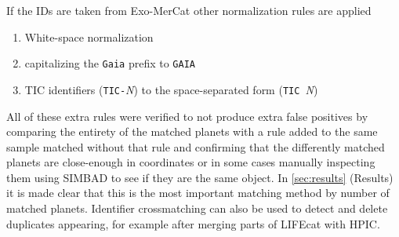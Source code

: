 If the IDs are taken from Exo-MerCat other normalization rules are applied 
\begin{enumerate}
    \item White-space normalization
    \item capitalizing the \texttt{Gaia} prefix to \texttt{GAIA}
    \item TIC identifiers (\texttt{TIC-}\textit{N}) to the space-separated form (\texttt{TIC~}\textit{N}) 
\end{enumerate} 
 All of these extra rules were verified to not produce extra false positives by comparing the entirety of the matched planets with a rule added to the same sample matched without that rule and confirming that the differently matched planets are close-enough in coordinates or in some cases manually inspecting them using SIMBAD to see if they are the same object.
In \cref{sec:results} (Results) it is made clear that this is the most important matching method by number of matched planets.
Identifier crossmatching can also be used to detect and delete duplicates appearing, for example after merging parts of LIFEcat with HPIC.
